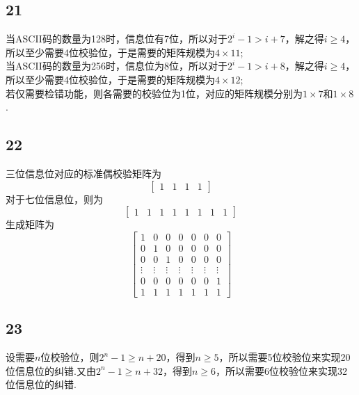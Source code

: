 \documentclass[twocolumn]{article}
\newenvironment{SChinese}{
	\CJKfamily{gbsn}
	\CJKtilde
	\CJKnospace}{}
\begin{document}
\begin{CJK}{UTF8}{}
\begin{SChinese}
			\subsection*{21}
				当ASCII码的数量为128时，信息位有7位，所以对于$2^i-1>i+7$，解之得$i\ge4$，所以至少需要4位校验位，于是需要的矩阵规模为$4\times11$;\\
				当ASCII码的数量为256时，信息位为8位，所以对于$2^i-1>i+8$，解之得$i\ge4$，所以至少需要4位校验位，于是需要的矩阵规模为$4\times12$;\\
				若仅需要检错功能，则各需要的校验位为1位，对应的矩阵规模分别为$1\times7$和$1\times8$.
			\subsection*{22}
				三位信息位对应的标准偶校验矩阵为\begin{displaymath}
					\left[\begin{matrix}
					1 & 1 & 1 & 1
					\end{matrix}\right]
				\end{displaymath}
				对于七位信息位，则为\begin{displaymath}
					\left[\begin{matrix}
					1 & 1 & 1 & 1 & 1 & 1 & 1 & 1
					\end{matrix}\right]
				\end{displaymath}
				生成矩阵为\begin{displaymath}
					\left[\begin{matrix}
					1 & 0 & 0 & 0 & 0 & 0 & 0\\
					0 & 1 & 0 & 0 & 0 & 0 & 0\\
					0 & 0 & 1 & 0 & 0 & 0 & 0\\
					\vdots & \vdots & \vdots & \vdots & \vdots & \vdots & \vdots\\
					0 & 0 & 0 & 0 & 0 & 0 & 1\\
					1 & 1 & 1 & 1 & 1 & 1 & 1
					\end{matrix}\right]
				\end{displaymath}
			\subsection*{23}
				设需要$n$位校验位，则$2^n-1\ge n+20$，得到$n\ge5$，所以需要5位校验位来实现20位信息位的纠错.又由$2^n-1\ge n+32$，得到$n\ge6$，所以需要6位校验位来实现32位信息位的纠错.
		
		\end{SChinese}
	\end{CJK}
\end{document}
